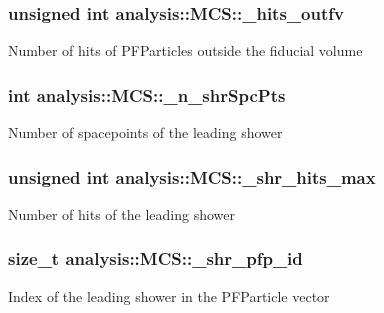 \subsubsection[{\texorpdfstring{\+\_\+hits\+\_\+outfv}{_hits_outfv}}]{\setlength{\rightskip}{0pt plus 5cm}unsigned int analysis\+::\+M\+C\+S\+::\+\_\+hits\+\_\+outfv\hspace{0.3cm}{\ttfamily [private]}}\hypertarget{classanalysis_1_1MCS_acdad4ea343efb4ded95933b0f28d9204}{}\label{classanalysis_1_1MCS_acdad4ea343efb4ded95933b0f28d9204}
Number of hits of P\+F\+Particles outside the fiducial volume 
\subsubsection[{\texorpdfstring{\+\_\+n\+\_\+shr\+Spc\+Pts}{_n_shrSpcPts}}]{\setlength{\rightskip}{0pt plus 5cm}int analysis\+::\+M\+C\+S\+::\+\_\+n\+\_\+shr\+Spc\+Pts\hspace{0.3cm}{\ttfamily [private]}}\hypertarget{classanalysis_1_1MCS_ad27ca6658e7785da24b9267d54722d65}{}\label{classanalysis_1_1MCS_ad27ca6658e7785da24b9267d54722d65}
Number of spacepoints of the leading shower 
\subsubsection[{\texorpdfstring{\+\_\+shr\+\_\+hits\+\_\+max}{_shr_hits_max}}]{\setlength{\rightskip}{0pt plus 5cm}unsigned int analysis\+::\+M\+C\+S\+::\+\_\+shr\+\_\+hits\+\_\+max\hspace{0.3cm}{\ttfamily [private]}}\hypertarget{classanalysis_1_1MCS_a497f861469c78449dc3c1b685b460b84}{}\label{classanalysis_1_1MCS_a497f861469c78449dc3c1b685b460b84}
Number of hits of the leading shower 
\subsubsection[{\texorpdfstring{\+\_\+shr\+\_\+pfp\+\_\+id}{_shr_pfp_id}}]{\setlength{\rightskip}{0pt plus 5cm}size\+\_\+t analysis\+::\+M\+C\+S\+::\+\_\+shr\+\_\+pfp\+\_\+id\hspace{0.3cm}{\ttfamily [private]}}\hypertarget{classanalysis_1_1MCS_a3072ad9091904d76bc24531bfd928045}{}\label{classanalysis_1_1MCS_a3072ad9091904d76bc24531bfd928045}
Index of the leading shower in the P\+F\+Particle vector 
